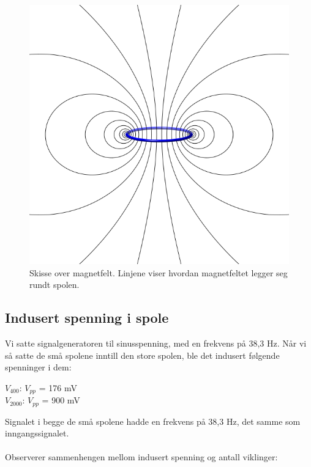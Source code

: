 \documentclass[12pt,norsk,a4paper]{article}
\begin{document}
\begin{figure}[H]
\begin{center}
\includegraphics[scale=0.4]{magnetsime-rundt-spole.png}
\caption{Skisse over magnetfelt. Linjene viser hvordan magnetfeltet legger seg rundt spolen.}
\label{fig:skisse-magnetfelt}
\end{center}
\end{figure}



\clearpage


\subsection{Indusert spenning i spole}
Vi satte signalgeneratoren til sinusspenning, med en frekvens på 38,3 Hz.
Når vi så satte de små spolene inntill den store spolen, ble det indusert følgende spenninger i dem:\\
\begin{center}
$V_{400}$: $V_{pp}$ = 176 mV\\

$V_{2000}$: $V_{pp}$ = 900 mV\\
\end{center}
Signalet i begge de små spolene hadde en frekvens på 38,3 Hz, det samme som inngangssignalet.\\
\\
Observerer sammenhengen mellom indusert spenning og antall viklinger:\\
\end{document}
